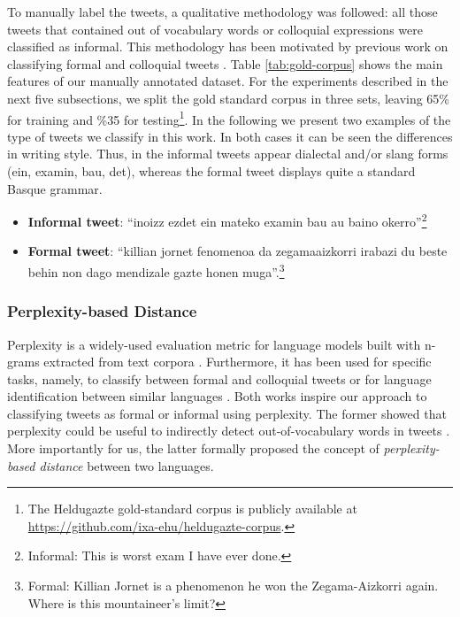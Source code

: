\documentclass[information,article,submit,moreauthors,pdftex,10pt,a4paper]{Definitions/mdpi}
\begin{document}
To manually label the tweets, a qualitative methodology was followed: all those tweets that contained out of vocabulary words or colloquial expressions were classified as informal. This methodology has been motivated by previous work on classifying formal and colloquial tweets \cite{gonzalez2015analysis}. Table \ref{tab:gold-corpus} shows the main features of our manually annotated dataset. For the experiments described in the next five subsections, we split the gold standard corpus in three sets, leaving 65\% for training and \%35 for testing\footnote{The Heldugazte gold-standard corpus is publicly available at \url{https://github.com/ixa-ehu/heldugazte-corpus}.}. In the following we present two examples of the type of tweets we classify in this work. In both cases it can be seen the differences in writing style. Thus, in the informal tweets appear dialectal and/or slang forms (ein, examin, bau, det), whereas the formal tweet displays quite a standard Basque grammar.

\begin{itemize}
\item[(1)] \textbf{Informal tweet}: ``inoizz ezdet ein mateko examin bau au baino okerro''\footnote{Informal: This is worst exam I have ever done.}
\item[(2)] \textbf{Formal tweet}: ``killian jornet fenomenoa da zegamaaizkorri irabazi du beste behin non dago mendizale gazte honen muga''.\footnote{Formal: Killian Jornet is a phenomenon he won the Zegama-Aizkorri again. Where is this mountaineer's limit?}
\end{itemize}

\subsubsection{Perplexity-based Distance}\label{sec:unsup-appr-text}

Perplexity is a widely-used evaluation metric for language models built with n-grams extracted from text corpora \cite{chen1999empirical}. Furthermore, it has been used for specific tasks, namely, to classify between formal and colloquial tweets \cite{gonzalez2015analysis} or for language identification between similar languages \cite{gamallo2017language}. Both works inspire our approach to classifying tweets as formal or informal using perplexity. The former showed that perplexity could be useful to indirectly detect out-of-vocabulary words in tweets \cite{gonzalez2015analysis}. More importantly for us, the latter formally proposed the concept of \emph{perplexity-based distance} between two languages.
\end{document}
